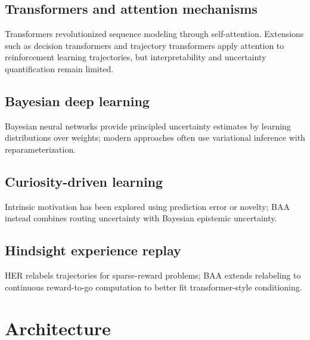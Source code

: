 \documentclass[11pt]{article}
\begin{document}
\subsection{Transformers and attention mechanisms}
Transformers revolutionized sequence modeling through self-attention. Extensions such as decision transformers and trajectory transformers apply attention to reinforcement learning trajectories, but interpretability and uncertainty quantification remain limited.

\subsection{Bayesian deep learning}
Bayesian neural networks provide principled uncertainty estimates by learning distributions over weights; modern approaches often use variational inference with reparameterization.

\subsection{Curiosity-driven learning}
Intrinsic motivation has been explored using prediction error or novelty; BAA instead combines routing uncertainty with Bayesian epistemic uncertainty.

\subsection{Hindsight experience replay}
HER relabels trajectories for sparse-reward problems; BAA extends relabeling to continuous reward-to-go computation to better fit transformer-style conditioning.

\section{Architecture}\label{sec:architecture}
\end{document}
